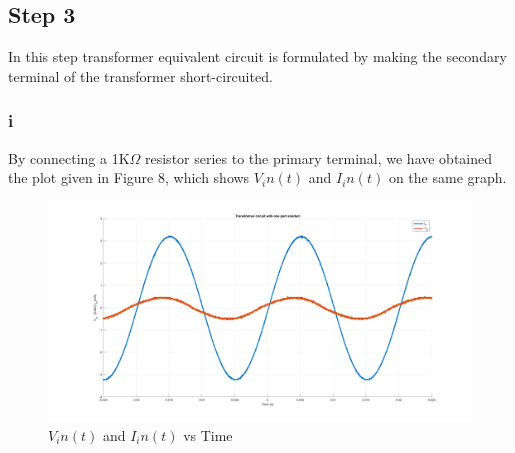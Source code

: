 \documentclass[letterpaper,12pt]{article}
\begin{document}
\subsection{Step 3}
In this step transformer equivalent circuit is formulated by making the secondary terminal of the transformer short-circuited.
\subsubsection{i}


%
By connecting a 1K\(\Omega\) resistor series to the primary terminal, we have obtained the plot given in Figure 8, which shows \(V_in(t) \) and \(I_in(t)\) on the same graph.  
\begin{figure}[H]
    \centering
    \includegraphics[width = 1\textwidth]{3_1.png}
    \caption{\(V_in(t) \) and \(I_in(t)\) vs Time }
\end{figure} 
\end{document}
